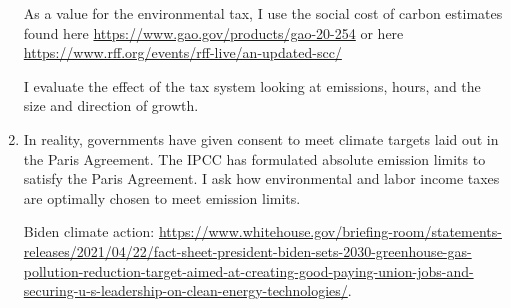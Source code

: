 \documentclass[12pt]{article}
\begin{document}
\begin{enumerate}
As a value for the environmental tax, I use the social cost of carbon estimates found here
\url{https://www.gao.gov/products/gao-20-254} or here \url{https://www.rff.org/events/rff-live/an-updated-scc/}

I evaluate the effect of the tax system looking at emissions, hours, and the size and direction of growth. 

\item In reality, governments have given consent to meet climate targets laid out in the Paris Agreement. The IPCC has formulated absolute emission limits to satisfy the Paris Agreement. I ask how environmental and labor income taxes are optimally chosen to meet emission limits. 

Biden climate action: 
\url{https://www.whitehouse.gov/briefing-room/statements-releases/2021/04/22/fact-sheet-president-biden-sets-2030-greenhouse-gas-pollution-reduction-target-aimed-at-creating-good-paying-union-jobs-and-securing-u-s-leadership-on-clean-energy-technologies/}. 
\end{enumerate}
\clearpage

	
\end{document}
